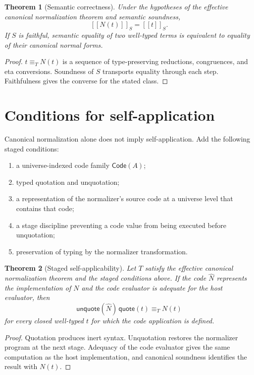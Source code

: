 \documentclass[11pt,a4paper]{article}
\newtheorem{theorem}{Theorem}[section]
\newcommand{\Code}{\mathsf{Code}}
\newcommand{\llbracket}{[\![}
\newcommand{\rrbracket}{]\!]}
\begin{document}
\begin{theorem}[Semantic correctness]
Under the hypotheses of the effective canonical normalization theorem and semantic soundness,
\[
\llbracket N(t)\rrbracket_S=\llbracket t\rrbracket_S.
\]
If $S$ is faithful, semantic equality of two well-typed terms is equivalent to equality of their canonical normal forms.
\end{theorem}
\begin{proof}
$t\equiv_TN(t)$ is a sequence of type-preserving reductions, congruences, and eta conversions. Soundness of $S$ transports equality through each step. Faithfulness gives the converse for the stated class.
\end{proof}

\section{Conditions for self-application}
Canonical normalization alone does not imply self-application. Add the following staged conditions:
\begin{enumerate}
\item a universe-indexed code family $\Code(A)$;
\item typed quotation and unquotation;
\item a representation of the normalizer's source code at a universe level that contains that code;
\item a stage discipline preventing a code value from being executed before unquotation;
\item preservation of typing by the normalizer transformation.
\end{enumerate}

\begin{theorem}[Staged self-applicability]
Let $T$ satisfy the effective canonical normalization theorem and the staged conditions above. If the code $\widehat N$ represents the implementation of $N$ and the code evaluator is adequate for the host evaluator, then
\[
\mathsf{unquote}(\widehat N)\,\mathsf{quote}(t)\equiv_T N(t)
\]
for every closed well-typed $t$ for which the code application is defined.
\end{theorem}
\begin{proof}
Quotation produces inert syntax. Unquotation restores the normalizer program at the next stage. Adequacy of the code evaluator gives the same computation as the host implementation, and canonical soundness identifies the result with $N(t)$.
\end{proof}
\end{document}
